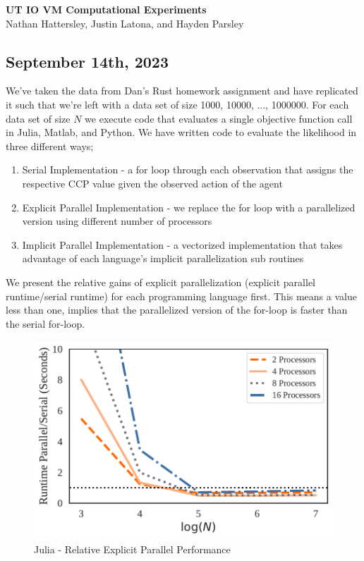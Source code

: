 \documentclass[a4paper, 12pt]{article}
\begin{document}
\begin{center}
    \Large \textbf{UT IO VM Computational Experiments}  \\
    Nathan Hattersley, Justin Latona, and Hayden Parsley 
\end{center}


\subsection{September 14th, 2023}

We've taken the data from Dan's Rust homework assignment and have replicated it such that we're left with a data set of size 1000, 10000, ..., 1000000. For each data set of size $N$ we execute code that evaluates a single objective function call in Julia, Matlab, and Python. We have written code to evaluate the likelihood in three different ways; 
\begin{enumerate}
    \item Serial Implementation - a for loop through each observation that assigns the respective CCP value given the observed action of the agent 
    \item Explicit Parallel Implementation - we replace the for loop with a parallelized version using different number of processors 
    \item Implicit Parallel Implementation - a vectorized implementation that takes advantage of each language's implicit parallelization sub routines 
\end{enumerate}

We present the relative gains of explicit parallelization (explicit parallel runtime/serial runtime) for each programming language first. This means a value less than one, implies that the parallelized version of the for-loop is faster than the serial for-loop. 

\begin{figure}[!ht]
    \centering
    \caption{Julia - Relative Explicit Parallel Performance}
    \includegraphics[scale = 0.75]{../figs/juliaNormParFor.pdf}
\end{figure}
\end{document}
